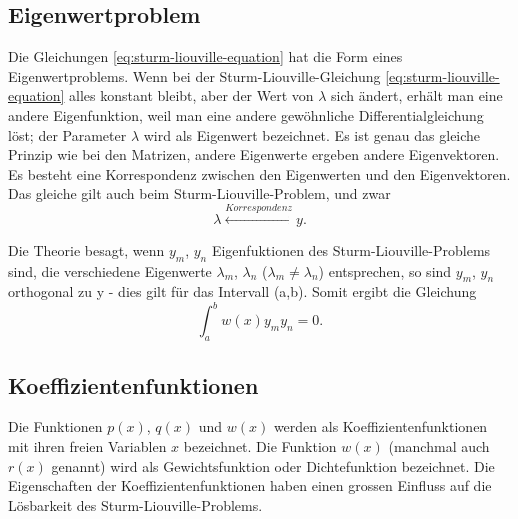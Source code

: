 \subsection{Eigenwertproblem}
Die Gleichungen \eqref{eq:sturm-liouville-equation} hat die Form eines Eigenwertproblems.
Wenn bei der Sturm-Liouville-Gleichung \eqref{eq:sturm-liouville-equation} alles  konstant bleibt, aber der Wert von $\lambda$ sich ändert, erhält man eine andere Eigenfunktion, weil man eine andere gewöhnliche Differentialgleichung löst;
der Parameter $\lambda$ wird als Eigenwert bezeichnet.
Es ist genau das gleiche Prinzip wie bei den Matrizen, andere Eigenwerte ergeben andere Eigenvektoren.
Es besteht eine Korrespondenz zwischen den Eigenwerten und den Eigenvektoren.
Das gleiche gilt auch beim Sturm-Liouville-Problem, und zwar
\begin{equation}
	\lambda \overset{Korrespondenz}\leftrightarrow y.
\end{equation}

Die Theorie besagt, wenn $y_m$, $y_n$ Eigenfuktionen des Sturm-Liouville-Problems sind, die verschiedene Eigenwerte $\lambda_m$, $\lambda_n$ ($\lambda_m \neq \lambda_n$) entsprechen, so sind $y_m$, $y_n$ orthogonal zu y -
dies gilt für das Intervall (a,b).
Somit ergibt die Gleichung
\begin{equation}
	\label{eq:skalar-sturm-liouville}
	\int_{a}^{b} w(x)y_m y_n = 0.
\end{equation}

\subsection{Koeffizientenfunktionen}
Die Funktionen $p(x)$, $q(x)$ und $w(x)$ werden als Koeffizientenfunktionen mit ihren freien Variablen $x$ bezeichnet.
Die Funktion $w(x)$ (manchmal auch $r(x)$ genannt) wird als Gewichtsfunktion oder Dichtefunktion bezeichnet.
Die Eigenschaften der Koeffizientenfunktionen haben einen grossen Einfluss auf die Lösbarkeit des Sturm-Liouville-Problems.

%
%

